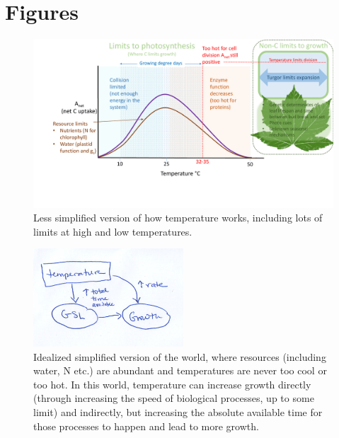 \documentclass[11pt]{article}
\begin{document}
\section{Figures}
\begin{figure}[h!]
\includegraphics[width=1\textwidth]{..//figures/grephonfig.pdf}
\caption{Less simplified version of how temperature works, including lots of limits at high and low temperatures.}
\label{fig:temperaturecomplex}
\end{figure}


\begin{figure}[h!]
\includegraphics[width=0.5\textwidth]{..//figures/gsltogrowth/gsltogrowth_emw1a.png}
\caption{Idealized simplified version of the world, where resources (including water, N etc.) are abundant and temperatures are never too cool or too hot. In this world, temperature can increase growth directly (through increasing the speed of biological processes, up to some limit) and indirectly, but increasing the absolute available time for those processes to happen and lead to more growth.}
\label{fig:concepbiotime}
\end{figure}
\end{document}
